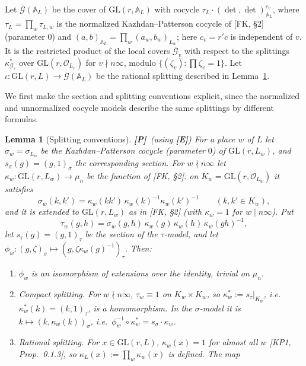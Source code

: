 \documentclass[12pt]{article}
\newcommand{\ov}[1]{\overline{#1}}
\newcommand{\A}{\mathbb{A}}
\newcommand{\cO}{\mathcal{O}}
\newcommand{\GL}{\mathrm{GL}}
\newcommand{\ks}{\kappa^{*}}
\newcommand{\cG}{\mathcal{G}}
\newcommand{\cGb}{\ov{\mathcal{G}}}
\newcommand{\Pv}{\textbf{[P]}}
\newcommand{\Ev}{\textbf{[E]}}
\theoremstyle{plain}
\newtheorem{lemma}[theorem]{Lemma}
\theoremstyle{definition}
\begin{document}
Let $\cGb(\A_L)$ be the cover of $\GL(r,\A_L)$ with cocycle $\tau_L\cdot(\det,\det)_{\A_L}^{c_v}$, where $\tau_L=\prod_w\tau_{L,w}$ is the normalized Kazhdan--Patterson cocycle of [FK, \S2] (parameter $0$) and $(a,b)_{\A_L}=\prod_w(a_w,b_w)_{L_w}$; here $c_v=r'c$ is independent of $v$. It is the restricted product of the local covers $\cGb_v$ with respect to the splittings $\ks_{\cG_v}$ over $\GL(r,\cO_{L_v})$ for $v\nmid n\infty$, modulo $\{(\zeta_v):\prod\zeta_v=1\}$. Let $\iota:\GL(r,L)\to\cGb(\A_L)$ be the rational splitting described in Lemma~\ref{lem:splittings}.

We first make the section and splitting conventions explicit, since the normalized and unnormalized cocycle models describe the same splittings by different formulas.

\begin{lemma}[Splitting conventions]\label{lem:splittings}\Pv\ (using \Ev)
For a place $w$ of $L$ let $\sigma_w=\sigma_{L_w}$ be the Kazhdan--Patterson cocycle (parameter $0$) of $\GL(r,L_w)$, and $s_\sigma(g)=(g,1)_\sigma$ the corresponding section. For $w\nmid n\infty$ let $\kappa_w:\GL(r,L_w)\to\mu_n$ be the function of [FK, \S2]: on $K_w=\GL(r,\cO_{L_w})$ it satisfies
\begin{equation}\label{eq:kappaK}
\sigma_w(k,k')=\kappa_w(kk')\,\kappa_w(k)^{-1}\kappa_w(k')^{-1}\qquad(k,k'\in K_w),
\end{equation}
and it is extended to $\GL(r,L_w)$ as in [FK, \S2] (with $\kappa_w=1$ for $w\mid n\infty$). Put
\begin{equation}\label{eq:tausigma}
\tau_w(g,h)=\sigma_w(g,h)\,\kappa_w(g)\,\kappa_w(h)\,\kappa_w(gh)^{-1},
\end{equation}
let $s_\tau(g)=(g,1)_\tau$ be the section of the $\tau$-model, and let $\phi_w:(g,\zeta)_\sigma\mapsto(g,\zeta\kappa_w(g)^{-1})_\tau$. Then:
\begin{enumerate}[label=(\alph*)]
\item $\phi_w$ is an isomorphism of extensions over the identity, trivial on $\mu_n$.
\item \emph{Compact splitting.} For $w\nmid n\infty$, $\tau_w\equiv1$ on $K_w\times K_w$, so $\ks_w:=s_\tau|_{K_w}$, i.e.\ $\ks_w(k)=(k,1)_\tau$, is a homomorphism. In the $\sigma$-model it is $k\mapsto(k,\kappa_w(k))_\sigma$, i.e.\ $\phi_w^{-1}\circ\ks_w=s_\sigma\cdot\kappa_w$.
\item \emph{Rational splitting.} For $x\in\GL(r,L)$, $\kappa_w(x)=1$ for almost all $w$ [KP1, Prop.~0.1.3], so $\kappa_L(x):=\prod_w\kappa_w(x)$ is defined. The map

\end{enumerate}
\end{lemma}
\end{document}
